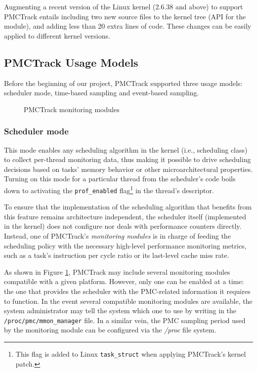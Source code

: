 Augmenting a recent version of the Linux kernel (2.6.38 and above) to support PMCTrack entails including two new source files to the kernel tree (API for the module), and adding less than 20 extra lines of code. These changes can be easily applied to different kernel versions.

\subsection{PMCTrack Usage Models}\label{pmctrack-usage-models}

Before the beginning of our project, PMCTrack supported three
usage models: scheduler mode, time-based sampling and event-based
sampling.

\begin{figure}[tbp!]
\centering
{}

\caption{PMCTrack monitoring modules}
\label{fig:mmon}
\end{figure}

\subsubsection{Scheduler mode}\label{scheduler-mode}

This mode enables any scheduling algorithm in the kernel (i.e.,
scheduling class) to collect per-thread monitoring data, thus making it
possible to drive scheduling decisions based on tasks' memory behavior
or other microarchitectural properties. Turning on this mode for a
particular thread from the scheduler's code boils down to activating the
\texttt{prof\_enabled}
flag\footnote{This flag is added to Linux \texttt{task\_struct} when applying PMCTrack's kernel patch.}
in the thread's descriptor.

To ensure that the implementation of the scheduling algorithm that
benefits from this feature remains architecture independent, the
scheduler itself (implemented in the kernel) does not configure nor
deals with performance counters directly. Instead, one of PMCTrack's
\textit{monitoring modules} is in charge of feeding the scheduling
policy with the necessary high-level performance monitoring metrics,
such as a task's instruction per cycle ratio or its last-level cache
miss rate.

As shown in Figure \ref{fig:mmon}, PMCTrack may include several
monitoring modules compatible with a given platform. However, only one
can be enabled at a time: the one that provides the scheduler with the
PMC-related information it requires to function. In the event several
compatible monitoring modules are available, the system administrator
may tell the system which one to use by writing in the
\texttt{/proc/pmc/mmon\_manager} file. In a similar vein, the PMC
sampling period used by the monitoring module can be configured via the
\emph{/proc} file system.

